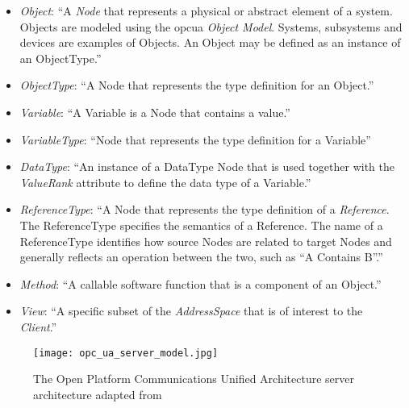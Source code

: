 \documentclass[
a4paper,
twoside,
headsepline,
cleardoublepage=empty,
parskip=half,
draft=false
]{scrbook}
\begin{document}
				\begin{itemize}

					\item \textit{Object}: ``A \textit{Node} that represents a physical or abstract element of a system. Objects are modeled using the \gls{opcua} \textit{Object Model}. Systems, subsystems and devices are examples of Objects. An Object may be defined as an instance of an ObjectType.''~\cite{opcfoundation2017part1}

					\item \textit{ObjectType}: ``A Node that represents the type definition
					for an Object.''~\cite{opcfoundation2017part1}

					\item \textit{Variable}: ``A Variable is a Node that contains a value.''~\cite{opcfoundation2017part1}

					\item \textit{VariableType}: ``Node that represents the type definition for a Variable''~\cite{opcfoundation2018part3}

					\item \textit{DataType}: ``An instance of a DataType Node that is used together with the \textit{ValueRank} attribute to define the data type of a Variable.''~\cite{opcfoundation2018part3}

					\item \textit{ReferenceType}: ``A Node that represents the type definition of a \textit{Reference}. The ReferenceType specifies the semantics of a Reference. The name of a ReferenceType identifies how source Nodes are related to target Nodes and generally reflects an operation between the two, such as “A Contains B”.''~\cite{opcfoundation2017part1}

					\item \textit{Method}: ``A callable software function that is a component of an Object.''~\cite{opcfoundation2017part1}

					\item \textit{View}: ``A specific subset of the \textit{AddressSpace} that is of interest to the \textit{Client}.''~\cite{opcfoundation2017part1}

				\end{itemize}

				\begin{figure}[H]
					\centering
					\texttt{[image: opc\_ua\_server\_model.jpg]}
					\caption{The Open Platform Communications Unified Architecture server architecture adapted from~\cite{opcfoundation2017part1}}
					\label{fig:opc_ua_server_model}
				\end{figure}
\end{document}
